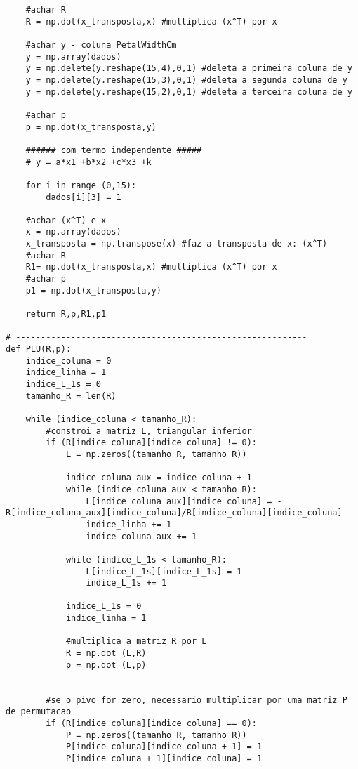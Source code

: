 \documentclass[a4paper,12pt,twoside]{article}
\begin{document}
\begin{lstlisting}
    #achar R
    R = np.dot(x_transposta,x) #multiplica (x^T) por x
    
    #achar y - coluna PetalWidthCm
    y = np.array(dados) 
    y = np.delete(y.reshape(15,4),0,1) #deleta a primeira coluna de y
    y = np.delete(y.reshape(15,3),0,1) #deleta a segunda coluna de y
    y = np.delete(y.reshape(15,2),0,1) #deleta a terceira coluna de y

    #achar p 
    p = np.dot(x_transposta,y) 
    
    ###### com termo independente #####
    # y = a*x1 +b*x2 +c*x3 +k
     
    for i in range (0,15):
        dados[i][3] = 1
    
    #achar (x^T) e x
    x = np.array(dados) 
    x_transposta = np.transpose(x) #faz a transposta de x: (x^T)
    #achar R
    R1= np.dot(x_transposta,x) #multiplica (x^T) por x
    #achar p 
    p1 = np.dot(x_transposta,y) 
    
    return R,p,R1,p1

# ----------------------------------------------------------
def PLU(R,p):
    indice_coluna = 0 
    indice_linha = 1
    indice_L_1s = 0
    tamanho_R = len(R)
    
    while (indice_coluna < tamanho_R):
        #constroi a matriz L, triangular inferior
        if (R[indice_coluna][indice_coluna] != 0):
            L = np.zeros((tamanho_R, tamanho_R))
            
            indice_coluna_aux = indice_coluna + 1
            while (indice_coluna_aux < tamanho_R):
                L[indice_coluna_aux][indice_coluna] = - R[indice_coluna_aux][indice_coluna]/R[indice_coluna][indice_coluna]
                indice_linha += 1
                indice_coluna_aux += 1
            
            while (indice_L_1s < tamanho_R):
                L[indice_L_1s][indice_L_1s] = 1
                indice_L_1s += 1
            
            indice_L_1s = 0
            indice_linha = 1
                 
            #multiplica a matriz R por L
            R = np.dot (L,R)
            p = np.dot (L,p)
        
                
        #se o pivo for zero, necessario multiplicar por uma matriz P de permutacao
        if (R[indice_coluna][indice_coluna] == 0):
            P = np.zeros((tamanho_R, tamanho_R))
            P[indice_coluna][indice_coluna + 1] = 1
            P[indice_coluna + 1][indice_coluna] = 1
            

\end{lstlisting}
\end{document}
